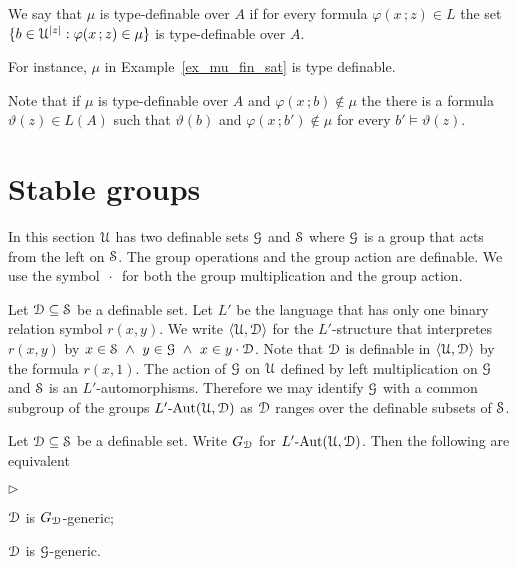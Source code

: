 \documentclass{amsproc}
\newcommand{\mylabel}[1]{{#1}\hfill}
\renewenvironment{itemize}
  {\begin{list}{$\triangleright$}{%
  \setlength{\parskip}{0mm}
  \setlength{\topsep}{.4\baselineskip}
  \setlength{\rightmargin}{0mm}
  \setlength{\listparindent}{0mm}
  \setlength{\itemindent}{0mm}
  \setlength{\labelwidth}{3ex}
  \setlength{\itemsep}{.2\baselineskip}
  \setlength{\parsep}{.2\baselineskip}
  \setlength{\partopsep}{0mm}
  \setlength{\labelsep}{1ex}
  \setlength{\leftmargin}{\labelwidth+\labelsep}
  \let\makelabel\mylabel}}{%
\end{list}}
\begin{document}
\begin{definition}
  We say that $\mu$ is type-definable over $A$ if for every formula $\varphi(x\,;z)\in L$ the set $\{b\in\EuScript U^{|z|} : \varphi(x\,;z)\in\mu\}$ is type-definable over $A$.
\end{definition}

For instance, $\mu$ in Example~\ref{ex_mu_fin_sat} is type definable.

Note that if $\mu$ is type-definable over $A$ and $\varphi(x\,;b)\notin\mu$ the there is a formula $\vartheta(z)\in L(A)$ such that $\vartheta(b)$ and $\varphi(x\,;b')\notin\mu$ for every $b'\models\vartheta(z)$.

\section{Stable groups}

In this section $\EuScript U$ has two definable sets $\EuScript G$ and $\EuScript S$ where $\EuScript G$ is a group that acts from the left on $\EuScript S$.
The group operations and the group action are definable.
We use the symbol $\,\cdot\,$ for both the group multiplication and the group action.

Let $\EuScript D\subseteq\EuScript S$ be a definable set.
Let $L'$ be the language that has only one binary relation symbol $r(x,y)$.
We write $\langle\EuScript U, \EuScript D\rangle$ for the $L'$-structure that interpretes $r(x,y)$ by $x\in\EuScript S\ \wedge\ y\in\EuScript G\ \wedge\  x\in y\cdot\EuScript D$.
Note that $\EuScript D$ is definable in $\langle\EuScript U, \EuScript D\rangle$ by the formula $r(x,1)$.
The action of $\EuScript G$ on $\EuScript U$ defined by left multiplication on $\EuScript G$ and $\EuScript S$ is an $L'$-automorphisms.
Therefore we may identify $\EuScript G$ with a common subgroup of the groups $L'\mbox{-Aut}({\EuScript U},{\EuScript D})$ as $\EuScript D$ ranges over the definable subsets of $\EuScript S$.


\begin{fact}\label{fact_generic_G_L}
Let $\EuScript D\subseteq\EuScript S$ be a definable set.
Write $G_{\EuScript D}$ for $L'\mbox{-Aut}({\EuScript U},{\EuScript D})$.
Then the following are equivalent
\begin{itemize}
  \item[1.] $\EuScript D$ is $G_{\EuScript D}$-generic;
  \item[2.] $\EuScript D$ is $\EuScript G$-generic.
\end{itemize}
\end{fact}
\end{document}
